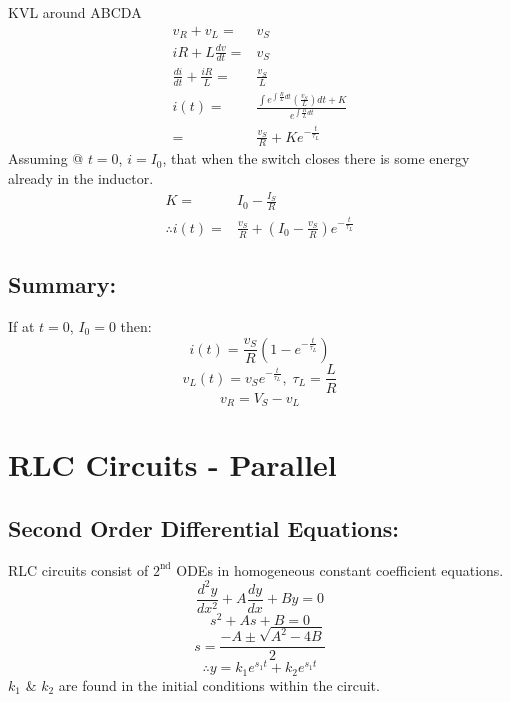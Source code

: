 \documentclass[a5paper]{article}
\begin{document}
	KVL around ABCDA
	\begin{align*}
		v_{R}+v_{L}=&v_{S}\\
		iR+L\frac{dv}{dt}=&v_{S}\\
		\frac{di}{dt}+\frac{iR}{L}=&\frac{v_{S}}{L}\\
		i(t)=&\frac{\int e^{\int\frac{R}{L}dt}(\frac{v_{S}}{L})dt+K}{e^{\int\frac{R}{L}dt}}\\
		=&\frac{v_{S}}{R}+Ke^{-\frac{t}{\tau_{L}}}
	\end{align*}
	Assuming @ $t=0$, $i=I_{0}$, that when the switch closes there is some energy already in the inductor.
	\begin{align*}
		K=&I_{0}-\frac{I_{S}}{R}\\
		\therefore i(t)=&\frac{v_{S}}{R}+(I_{0}-\frac{v_{S}}{R})e^{-\frac{t}{\tau_{L}}}
	\end{align*}
	\subsection{Summary:}
	If at $t=0$, $I_{0}=0$ then:
	$$i(t)=\frac{v_{S}}{R}(1-e^{-\frac{t}{\tau_{L}}})$$
	$$v_{L}(t)=v_{S}e^{-\frac{t}{\tau_{L}}},\;\tau_{L}=\frac{L}{R}$$
	$$v_{R}=V_{S}-v_{L}$$

	\section{RLC Circuits - Parallel}
	\subsection{Second Order Differential Equations:}
	RLC circuits consist of $2^{\text{nd}}$ ODEs in homogeneous constant coefficient equations.
	$$\frac{d^{2}y}{dx^{2}}+A\frac{dy}{dx}+By=0$$
	$$s^{2}+As+B=0$$
	$$s=\frac{-A\pm\sqrt{A^{2}-4B}}{2}$$
	$$\therefore y=k_{1}e^{s_{1}t}+k_{2}e^{s_{1}t}$$
	$k_{1}$ \& $k_{2}$ are found in the initial conditions within the circuit.
\end{document}
